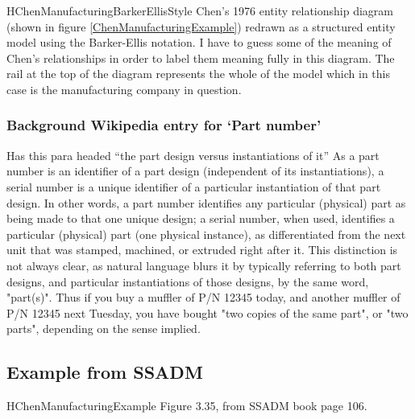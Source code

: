\begin{erboxedFigure} {H}{ChenManufacturingBarkerEllisStyle}{
Chen's 1976 entity relationship diagram (shown in figure \ref{ChenManufacturingExample}) 
redrawn as a structured entity model using the Barker-Ellis notation. 
I have to guess some of the meaning of Chen's relationships in order to label them meaning fully in
 this diagram. 
 The rail at the top of the diagram represents the whole of the model which in this case is the manufacturing company in question.
}
\begin{center}
\scalebox{0.95}{}
\end{center}
\end{erboxedFigure}

\subsubsection{Background Wikipedia entry for `Part number'}
Has this para headed ``the part design versus instantiations of it''
As a part number is an identifier of a part design (independent of its instantiations), a serial number is a unique identifier of a particular instantiation of that part design. In other words, a part number identifies any particular (physical) part as being made to that one unique design; a serial number, when used, identifies a particular (physical) part (one physical instance), as differentiated from the next unit that was stamped, machined, or extruded right after it. This distinction is not always clear, as natural language blurs it by typically referring to both part designs, and particular instantiations of those designs, by the same word, "part(s)". Thus if you buy a muffler of P/N 12345 today, and another muffler of P/N 12345 next Tuesday, you have bought "two copies of the same part", or "two parts", depending on the sense implied.

\subsection{Example from SSADM}
\begin{erboxedFigure} {H}{ChenManufacturingExample}{
Figure 3.35, from SSADM book page 106.
}
\begin{center}
\scalebox{0.95}{}
\end{center}
\end{erboxedFigure}